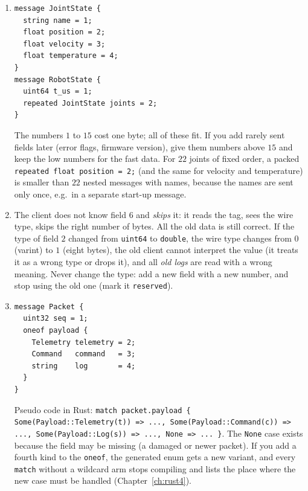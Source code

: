 \begin{enumerate}[label=\textbf{\ansnum.\arabic*}]
\begin{verbatim}
fn main() {
    for n in [-3, 3, -100, 0, -1] { print!("{n}->{} ", zigzag(n)); }
    println!();
    println!("{} {}", unzigzag(7), unzigzag(8));
}
\end{verbatim}
prints \verb!-3->5 3->6 -100->199 0->0 -1->1! and \verb!-4 4!. Small negative numbers become small positive numbers, which are short varints: $-1$ takes one byte instead of ten (a plain \verb!int32! encodes a negative number as a huge unsigned number).
  \item
\begin{verbatim}
message JointState {
  string name = 1;
  float position = 2;
  float velocity = 3;
  float temperature = 4;
}
message RobotState {
  uint64 t_us = 1;
  repeated JointState joints = 2;
}
\end{verbatim}
The numbers $1$ to $15$ cost one byte; all of these fit. If you add rarely sent fields later (error flags, firmware version), give them numbers above $15$ and keep the low numbers for the fast data. For $22$ joints of fixed order, a packed \verb!repeated float position = 2;! (and the same for velocity and temperature) is smaller than $22$ nested messages with names, because the names are sent only once, e.g.\ in a separate start-up message.
  \item The client does not know field $6$ and \emph{skips} it: it reads the tag, sees the wire type, skips the right number of bytes. All the old data is still correct. If the type of field $2$ changed from \verb!uint64! to \verb!double!, the wire type changes from $0$ (varint) to $1$ (eight bytes), the old client cannot interpret the value (it treats it as a wrong type or drops it), and all \emph{old logs} are read with a wrong meaning. Never change the type: add a new field with a new number, and stop using the old one (mark it \verb!reserved!).
  \item
\begin{verbatim}
message Packet {
  uint32 seq = 1;
  oneof payload {
    Telemetry telemetry = 2;
    Command   command   = 3;
    string    log       = 4;
  }
}
\end{verbatim}
Pseudo code in Rust: \verb!match packet.payload { Some(Payload::Telemetry(t)) => ..., Some(Payload::Command(c)) => ..., Some(Payload::Log(s)) => ..., None => ... }!. The \verb!None! case exists because the field may be missing (a damaged or newer packet). If you add a fourth kind to the \verb!oneof!, the generated enum gets a new variant, and every \verb!match! without a wildcard arm stops compiling and lists the place where the new case must be handled (Chapter~\ref{ch:rust4}).

\end{enumerate}

